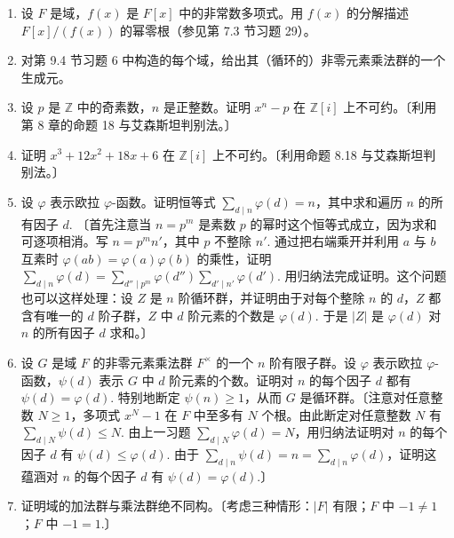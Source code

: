\begin{enumerate}
\item 设 \(F\) 是域，\(f(x)\) 是 \(F[x]\) 中的非常数多项式。用 \(f(x)\) 的分解描述 \(F[x]/(f(x))\) 的幂零根（参见第 7.3 节习题 29）。

\item 对第 9.4 节习题 6 中构造的每个域，给出其（循环的）非零元素乘法群的一个生成元。

\item 设 \(p\) 是 \(\mathbb{Z}\) 中的奇素数，\(n\) 是正整数。证明 \(x^n-p\) 在 \(\mathbb{Z}[i]\) 上不可约。〔利用第 8 章的命题 18 与艾森斯坦判别法。〕

\item 证明 \(x^3+12x^2+18x+6\) 在 \(\mathbb{Z}[i]\) 上不可约。〔利用命题 8.18 与艾森斯坦判别法。〕

\item 设 \(\varphi\) 表示欧拉 \(\varphi\)-函数。证明恒等式 \(\sum_{d \mid n}\varphi(d) = n\)，其中求和遍历 \(n\) 的所有因子 \(d\). 〔首先注意当 \(n = p^m\) 是素数 \(p\) 的幂时这个恒等式成立，因为求和可逐项相消。写 \(n = p^mn'\)，其中 \(p\) 不整除 \(n'\). 通过把右端乘开并利用 \(a\) 与 \(b\) 互素时 \(\varphi(ab) = \varphi(a)\varphi(b)\) 的乘性，证明 \(\sum_{d \mid n}\varphi(d) = \sum_{d'' \mid p^m}\varphi(d'')\sum_{d' \mid n'}\varphi(d')\). 用归纳法完成证明。这个问题也可以这样处理：设 \(Z\) 是 \(n\) 阶循环群，并证明由于对每个整除 \(n\) 的 \(d\)，\(Z\) 都含有唯一的 \(d\) 阶子群，\(Z\) 中 \(d\) 阶元素的个数是 \(\varphi(d)\). 于是 \(|Z|\) 是 \(\varphi(d)\) 对 \(n\) 的所有因子 \(d\) 求和。〕

\item 设 \(G\) 是域 \(F\) 的非零元素乘法群 \(F^\times\) 的一个 \(n\) 阶有限子群。设 \(\varphi\) 表示欧拉 \(\varphi\)-函数，\(\psi(d)\) 表示 \(G\) 中 \(d\) 阶元素的个数。证明对 \(n\) 的每个因子 \(d\) 都有 \(\psi(d) = \varphi(d)\). 特别地断定 \(\psi(n) \geq 1\)，从而 \(G\) 是循环群。〔注意对任意整数 \(N \geq 1\)，多项式 \(x^N-1\) 在 \(F\) 中至多有 \(N\) 个根。由此断定对任意整数 \(N\) 有 \(\sum_{d \mid N}\psi(d) \leq N\). 由上一习题 \(\sum_{d \mid N}\varphi(d) = N\)，用归纳法证明对 \(n\) 的每个因子 \(d\) 有 \(\psi(d) \leq \varphi(d)\). 由于 \(\sum_{d \mid n}\psi(d) = n = \sum_{d \mid n}\varphi(d)\)，证明这蕴涵对 \(n\) 的每个因子 \(d\) 有 \(\psi(d) = \varphi(d)\).〕

\item 证明域的加法群与乘法群绝不同构。〔考虑三种情形：\(|F|\) 有限；\(F\) 中 \(-1 \neq 1\)；\(F\) 中 \(-1 = 1\).〕
\end{enumerate}

